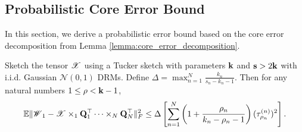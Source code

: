\subsection{Probabilistic Core Error Bound}
In this section, we derive a probabilistic error bound
based on the core error decomposition from  Lemma \ref{lemma:core_error_decomposition}.
\begin{lem}
\label{lemma:err_core_sketch}
Sketch the tensor $\T{X}$ using a Tucker sketch with parameters $\mathbf{k}$ and $\mathbf{s} > 2 \mathbf{k}$
with i.i.d. Gaussian $\mathcal N(0,1)$ DRMs.
Define $\Delta = \max_{n=1}^N \frac{k_n}{s_n-k_n-1}$.
Then for any natural numbers $1 \le \mathbf{\rho} < \mathbf{k}-1$,
\begin{equation}
\mathbb{E} \|\T{W}_1 - \T{X}\times_1 \M{Q}_1^\top \dots \times_N \M{Q}_N^\top\|_F^2 \le \Delta \left[ \sum_{n=1}^N \left(1+\frac{\rho_n}{k_n-\rho_n-1}\right)(\tau^{(n)}_{\rho_n})^2\right]. \nonumber
\end{equation}
\end{lem}
